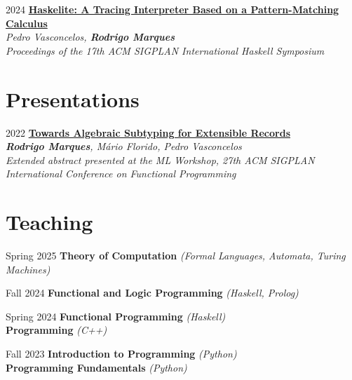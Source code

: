 \documentclass[12pt,a4paper]{moderncv}
\newenvironment{datedescription}{%
    \begin{description}[
        style=multiline,
        labelwidth=66pt,
        labelsep=6pt,
        leftmargin=72pt,
        align=right,
        font=\normalfont\itshape,
        itemsep=0.25em,
        parsep=0pt,
        topsep=0.25em
    ]
}{\end{description}}
\begin{document}
\begin{datedescription}
    \item[2024]
        \href{https://doi.org/10.1145/3677999.3678274}{\textbf{Haskelite: A Tracing Interpreter Based on a Pattern-Matching Calculus}}
        \\ \emph{Pedro Vasconcelos, \textbf{Rodrigo Marques}}
        \\ \emph{Proceedings of the 17th ACM SIGPLAN International Haskell Symposium}
\end{datedescription}


\section{Presentations}

\begin{datedescription}
    \item[2022]
        \href{https://arxiv.org/abs/2407.06747}{\textbf{Towards Algebraic Subtyping for Extensible Records}}
        \\ \emph{\textbf{Rodrigo Marques}, Mário Florido, Pedro Vasconcelos}                                
        \\ \emph{Extended abstract presented at the ML Workshop, 27th ACM SIGPLAN International Conference on Functional Programming}
\end{datedescription}


\section{Teaching}


\begin{datedescription}
    \item[Spring 2025] \textbf{Theory of Computation} \emph{(Formal Languages, Automata, Turing Machines)}
    \item[Fall 2024] \textbf{Functional and Logic Programming} \emph{(Haskell, Prolog)}
    \item[Spring 2024] \textbf{Functional Programming} \emph{(Haskell)}\\
                                         \textbf{Programming} \emph{(C++)}
    \item[Fall 2023] \textbf{Introduction to Programming} \emph{(Python)}\\
                                         \textbf{Programming Fundamentals} \emph{(Python)}
\end{datedescription}
\end{document}
